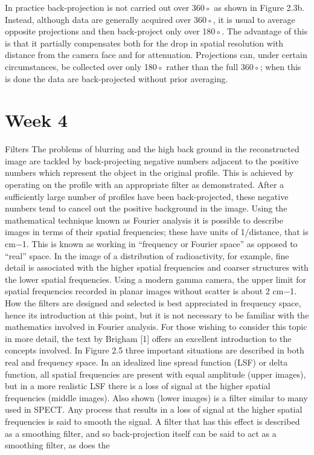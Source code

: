 \documentclass[12pt]{article}
\begin{document}
In practice back-projection is not carried out over 360◦ as shown in Figure 2.3b. Instead, although data are generally acquired over 360◦, it is usual to average opposite projections and then back-project only over 180◦. The advantage of
this is that it partially compensates both for the drop in spatial resolution with distance from the camera face and for attenuation. Projections can, under certain circumstances, be collected over only 180◦ rather than the full 360◦; when this is done the data are back-projected without prior
averaging.

\section*{Week 4}
Filters
The problems of blurring and the high background in the reconstructed image are tackled by back-projecting negative numbers adjacent to the
positive numbers which represent the object in the original profile. This is achieved by operating on the profile with an appropriate filter as demonstrated. After a sufficiently large number of profiles have been back-projected, these negative numbers tend to cancel out the positive background in the image. Using the mathematical technique known as Fourier analysis it is possible to describe images in terms of their spatial frequencies; these have units of 1/distance, that is cm−1. This is known as working in “frequency or Fourier space” as opposed to “real” space. In the image of a distribution of radioactivity, for example, fine detail is associated with the higher spatial frequencies and coarser structures with the lower spatial frequencies.
Using a modern gamma camera, the upper limit for spatial frequencies recorded in planar images without scatter is about 2 cm−1. How the filters are designed and selected is best appreciated in frequency space, hence its introduction at this point, but it is not necessary to be familiar with the mathematics involved in Fourier analysis. For those wishing to consider this topic in
more detail, the text by Brigham [1] offers an excellent introduction to the concepts involved. In Figure 2.5 three important situations are described
in both real and frequency space. In an idealized line spread function (LSF) or delta function, all spatial frequencies are present with equal amplitude (upper images), but in a more realistic LSF there is a loss of signal at the higher spatial frequencies (middle images). Also shown (lower images) is a filter similar to many used in SPECT. Any process that results in a loss of signal at the higher spatial frequencies is said to smooth the signal. A filter that has this effect is described as a smoothing filter, and so back-projection itself can be said to act as a smoothing filter, as does the
\end{document}
